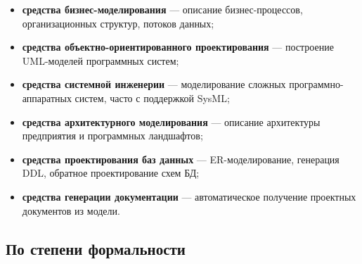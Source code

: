 \documentclass[12pt,a4paper]{article}
\begin{document}
\begin{itemize}
    \item \textbf{средства бизнес-моделирования} --- описание бизнес-процессов, организационных структур, потоков данных;
    \item \textbf{средства объектно-ориентированного проектирования} --- построение UML-моделей программных систем;
    \item \textbf{средства системной инженерии} --- моделирование сложных программно-аппаратных систем, часто с поддержкой SysML;
    \item \textbf{средства архитектурного моделирования} --- описание архитектуры предприятия и программных ландшафтов;
    \item \textbf{средства проектирования баз данных} --- ER-моделирование, генерация DDL, обратное проектирование схем БД;
    \item \textbf{средства генерации документации} --- автоматическое получение проектных документов из модели.
\end{itemize}

\subsection{По степени формальности}
\end{document}
